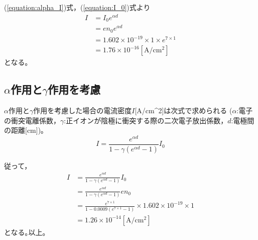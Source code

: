 \documentclass[a4paper, twocolumn]{ltjsarticle}
\begin{document}
    (\ref{equation:alpha_I})式，(\ref{equation:I_0})式より
    \begin{equation}
      \begin{split}
        I &= I_0 e^{\alpha d} \\
          &= e n_0 e^{\alpha d} \\
          &= 1.602 \times 10^{-19} \times 1 \times e^{7 \times 1} \\
          &= 1.76 \times 10^{-16} [\si{\ampere} / \si{\centi \meter ^ 2}]
      \end{split}
      \label{equation:alpha_I_answer}
    \end{equation} 
    となる｡


  \subsection*{\(\alpha\)作用と\(\gamma\)作用を考慮}
    \(\alpha\)作用と\(\gamma\)作用を考慮した場合の電流密度\(I\)[A/cm^2]は次式で求められる (\(\alpha\):電子の衝突電離係数，\(\gamma\):正イオンが陰極に衝突する際の二次電子放出係数，\(d\):電極間の距離[cm])｡
    \begin{equation}
      I = \frac{e^{\alpha d}}{1-\gamma (e^{\alpha d} - 1)} I_0
      \label{equation:gamma_I}
    \end{equation}

    従って，
    \begin{equation}
      \begin{split}
        I &= \frac{e^{\alpha d}}{1-\gamma (e^{\alpha d} - 1)} I_0 \\
          &= \frac{e^{\alpha d}}{1-\gamma (e^{\alpha d} - 1)} e n_0 \\
          &= \frac{e^{7 \times 1}}{1 - 0.0009(e^{7 \times 1} - 1)} \times 1.602 \times 10^{-19} \times 1 \\
          &= 1.26 \times 10^{-14} [\si{\ampere} / \si{\centi \meter ^ 2}]
      \end{split}
      \label{equation:gamma_I_answer}
    \end{equation}
    となる｡以上｡



\end{document}
